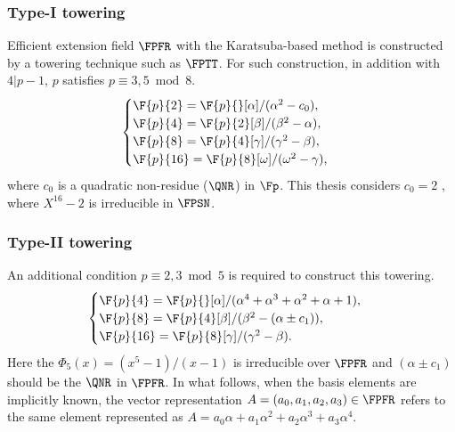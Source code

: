 \subsubsection{Type-I towering}
Efficient extension field $\FPFR$ with the Karatsuba-based method is constructed by a towering technique such as $\FPTT$. 
For such construction, in addition with $4|p-1$, $p$ satisfies $p \equiv 3, 5 \bmod 8$.  
\begin{equation}\label{towering_1}
\begin{cases}
\F{p}{2} = \F{p}{}[\alpha]/(\alpha^2-c_0),  \\ 
\F{p}{4} = \F{p}{2}[\beta]/(\beta^2-\alpha),  \\ 
\F{p}{8} = \F{p}{4}[\gamma]/(\gamma^2-\beta), \\ 
\F{p}{16} = \F{p}{8}[\omega]/(\omega^2-\gamma), \\ 
\end{cases}
\end{equation}
where  $c_0$ is a quadratic non-residue  ($\QNR$) in $\Fp$. 
This thesis considers  $c_0 = 2$ , where $X^{16}-2$ is irreducible in $\FPSN$.

\subsubsection{Type-II towering}
An additional condition $p \equiv 2, 3 \bmod 5$ is required to construct this towering. 
\begin{equation}\label{towering_2}
\begin{cases}
\F{p}{4} = \F{p}{}[\alpha]/(\alpha^4+\alpha^3+\alpha^2+\alpha+1),  \\ 
\F{p}{8} = \F{p}{4}[\beta]/(\beta^2-(\alpha \pm c_1)),  \\ 
\F{p}{16} = \F{p}{8}[\gamma]/(\gamma^2-\beta). \\ 
\end{cases}
\end{equation}
Here the $\Phi_{5}(x) = (x^{5}-1)/(x-1)$ is irreducible over $\FPFR$ and $(\alpha \pm c_1)$ should be the $\QNR$ in $\FPFR$.
In what follows, when the basis elements are implicitly known, the vector representation  $A=(a_0,a_1,a_2,a_3) \in \FPFR$ refers to the same element represented as $A=a_0 \alpha+ a_1\alpha^2+ a_2\alpha^3+a_3\alpha^4$.

